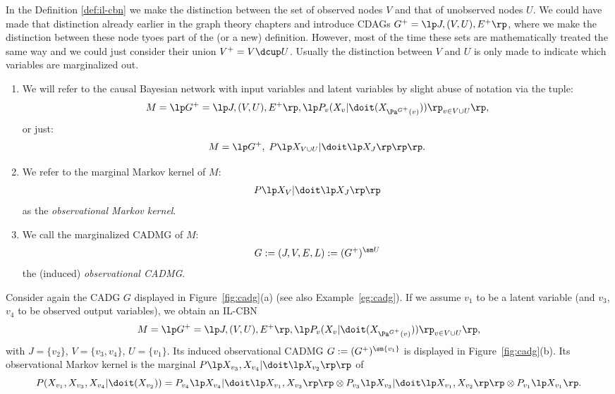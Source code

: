 \begin{Rem}
    In the Definition \ref{def:il-cbn} we make the distinction between the set of observed nodes $V$ and that of unobserved nodes $U$.
    We could have made that distinction already earlier in the graph theory chapters and introduce CDAGs
    $G^+ = \lp J, (V,U),E^+ \rp$, where we make the distinction between these node tyoes part of the (or a new) definition.
    However, most of the time these sets are mathematically treated the same way and we could just consider 
    their union $V^+= V \dcup U$. Usually the distinction between $V$ and $U$ is only made to indicate which variables are marginalized out.
\end{Rem}


\begin{Not}
    \begin{enumerate}
        \item We will refer to the causal Bayesian network with input variables and latent variables by slight abuse of notation via the tuple:
            \[ M= \lp G^+=\lp J,(V,U),E^+ \rp, \lp P_v ( X_v|\doit( X_{\Pa^{G^+}(v)})) \rp_{v \in V \cup U} \rp,  \]
or just:
\[ M = \lp G^+, \; P\lp X_{V \cup U}| \doit\lp X_J \rp\rp \rp.\]
    \item     We refer to the marginal Markov kernel of $M$:
    \[  P\lp X_V| \doit\lp X_J \rp\rp  \]
    as the \emph{observational Markov kernel}. 
    \item     We call the marginalized CADMG of $M$:
    \[ G := (J,V,E,L) := (G^+)^{\sm U}  \]
    the (induced) \emph{observational CADMG}.
    \end{enumerate}
\end{Not}

\begin{Eg}
  Consider again the CADG $G$ displayed in Figure~\ref{fig:cadg}(a) (see also Example~\ref{eg:cadg}).
  If we assume $v_1$ to be a latent variable (and $v_3$, $v_4$ to be observed output variables),
  we obtain an IL-CBN 
    \[ M= \lp G^+=\lp J,(V,U),E^+ \rp, \lp P_v ( X_v|\doit( X_{\Pa^{G^+}(v)})) \rp_{v \in V \cup U} \rp,  \]
  with $J = \{v_2\}$, $V = \{v_3,v_4\}$, $U = \{v_1\}$. Its induced observational CADMG $G := (G^+)^{\sm \{v_1\}}$ 
  is displayed in Figure~\ref{fig:cadg}(b). Its observational Markov kernel is
  the marginal $P\lp X_{v_3},X_{v_4} | \doit\lp X_{v_2} \rp\rp$ of
    \[  P(X_{v_1},X_{v_3},X_{v_4}|\doit(X_{v_2})) = P_{v_4} \lp X_{v_4}|\doit\lp X_{v_1},X_{v_3}\rp\rp \otimes P_{v_3} \lp X_{v_3}|\doit\lp X_{v_1},X_{v_2}\rp\rp \otimes P_{v_1} \lp X_{v_1} \rp. \]
\end{Eg}


